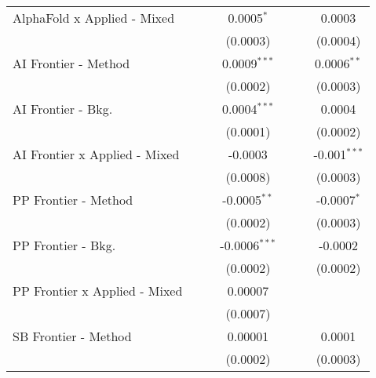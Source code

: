\begin{tabular}{lcccccc}
   AlphaFold x Applied - Mixed   &               &               & 0.0005$^{*}$    &               &               & 0.0003\\   
                                 &               &               & (0.0003)        &               &               & (0.0004)\\   
   AI Frontier - Method          &               &               & 0.0009$^{***}$  &               &               & 0.0006$^{**}$\\   
                                 &               &               & (0.0002)        &               &               & (0.0003)\\   
   AI Frontier - Bkg.            &               &               & 0.0004$^{***}$  &               &               & 0.0004\\   
                                 &               &               & (0.0001)        &               &               & (0.0002)\\   
   AI Frontier x Applied - Mixed &               &               & -0.0003         &               &               & -0.001$^{***}$\\   
                                 &               &               & (0.0008)        &               &               & (0.0003)\\   
   PP Frontier - Method          &               &               & -0.0005$^{**}$  &               &               & -0.0007$^{*}$\\   
                                 &               &               & (0.0002)        &               &               & (0.0003)\\   
   PP Frontier - Bkg.            &               &               & -0.0006$^{***}$ &               &               & -0.0002\\   
                                 &               &               & (0.0002)        &               &               & (0.0002)\\   
   PP Frontier x Applied - Mixed &               &               & 0.00007         &               &               &   \\   
                                 &               &               & (0.0007)        &               &               &   \\   
   SB Frontier - Method          &               &               & 0.00001         &               &               & 0.0001\\   
                                 &               &               & (0.0002)        &               &               & (0.0003)\\   

\end{tabular}
